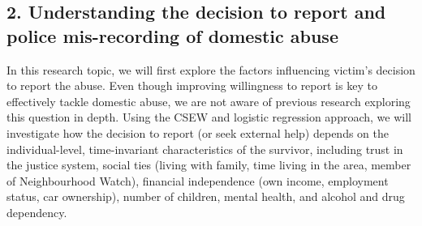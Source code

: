 \documentclass[11pt, a4paper]{article}
\begin{document}













\subsection*{2. Understanding the decision to report and police mis-recording of domestic abuse}

In this research topic, we will first explore the factors influencing victim's decision to report the abuse. Even though improving willingness to report is key to effectively tackle domestic abuse, we are not aware of previous research exploring this question in depth. Using the CSEW and logistic regression approach, we will investigate how the decision to report (or seek external help) depends on the individual-level, time-invariant characteristics of the survivor, including trust in the justice system, social ties (living with family, time living in the area, member of Neighbourhood Watch), financial independence (own income, employment status, car ownership), number of children, mental health, and alcohol and drug dependency. 
\end{document}
